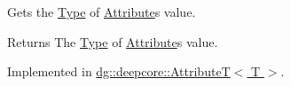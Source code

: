 Gets the \hyperlink{classdg_1_1deepcore_1_1_type}{Type} of \hyperlink{classdg_1_1deepcore_1_1_attribute}{Attribute}\textquotesingle{}s value. 

\begin{DoxyReturn}{Returns}
The \hyperlink{classdg_1_1deepcore_1_1_type}{Type} of \hyperlink{classdg_1_1deepcore_1_1_attribute}{Attribute}\textquotesingle{}s value. 
\end{DoxyReturn}


Implemented in \hyperlink{structdg_1_1deepcore_1_1_attribute_t_a01feaa6ee7327284f7e618152f733ff1}{dg\+::deepcore\+::\+Attribute\+T$<$ T $>$}.

